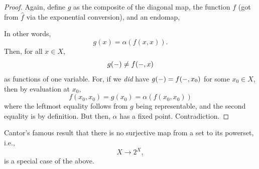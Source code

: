 \documentclass[11pt]{book}
\theoremstyle{definition}
\theoremstyle{definition}
\theoremstyle{definition}
\theoremstyle{theorem}
\theoremstyle{definition}
\begin{document}
\begin{proof}
	Again, define $g$ as the composite of the diagonal map, the function $f$ (got from $\hat{f}$ via the exponential conversion), and an endomap, 
	\begin{center}
	\end{center}  
	In other words, 
	\begin{equation*}
	g(x) = \alpha(f(x,x)).
	\end{equation*}
	Then, for all $x \in X$, 
	\begin{equation*}
	g(\--) \neq f(\--, x)
	\end{equation*}
	as functions of one variable. For, if we \textit{did} have $g(\--) = f(\--, x_0)$ for some $x_0 \in X$, then by evaluation at $x_0$, 
	\begin{equation*}
	f(x_0, x_0) = g(x_0) = \alpha(f(x_0, x_0))
	\end{equation*}
	where the leftmost equality follows from $g$ being representable, and the second equality is by definition. But then, $\alpha$ has a fixed point. Contradiction.  
\end{proof}
Cantor's famous result that there is no surjective map from a set to its powerset, i.e., 
	\begin{equation*}
	X \rightarrow 2^X,
	\end{equation*}
	is a special case of the above.\par 
\end{document}
